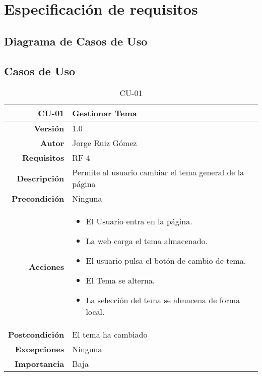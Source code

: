 \section{Especificación de requisitos}

\subsection{Diagrama de Casos de Uso}

\subsection{Casos de Uso}


\begin{table}[]
\centering
\begin{tabular}{r|p{}}
\hline
\textbf{CU-01}         & \textbf{Gestionar Tema}                                 \\ \hline
\textbf{Versión}       & 1.0                                                     \\
\textbf{Autor}         & Jorge Ruiz Gómez                                        \\
\textbf{Requisitos}    & RF-4                                         \\
\textbf{Descripción}   & Permite al usuario cambiar el tema general de la página \\ \hline
\textbf{Precondición}  & Ninguna                                                 \\
\textbf{Acciones}      &    \begin{itemize}
                                \item El Usuario entra en la página.
                                \item La web carga el tema almacenado.
                                \item El usuario pulsa el botón de cambio de tema.
                                \item El Tema se alterna.
                                \item La selección del tema se almacena de forma local.
                            \end{itemize}\\
                                                                          
\textbf{Postcondición} & El tema ha cambiado                                     \\
\textbf{Excepciones}   & Ninguna                                                 \\
\textbf{Importancia}   & Baja                                                    \\ \hline
\end{tabular}
\caption{CU-01}
\label{tab:my-table}
\end{table}


